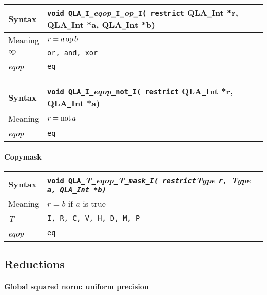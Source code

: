 \documentclass{article}
\newcommand{\op}{\mathop{\rm op}}
\renewcommand{\not}{\mathop{\rm not}}
\newcommand{\tInt}{QLA\ttdash Int }
\newcommand{\namespace}{QLA}
\newcommand{\allNumericTypes}{{\tt I, R, C, V, H, D, M, P}}
\newcommand{\ttdash}{{\tt \_}}
\newcommand{\itt}{\it T}
\newcommand{\extraarg}{}
\begin{document}
\begin{flushleft}
  \begin{tabular}{|l|l|}
  \hline
  Syntax      & {\tt void \namespace}\ttdash{\tt I}\ttdash{\it eqop}\ttdash{\tt I}\ttdash{\it op}\ttdash{\tt I( restrict}{ \tInt *r, \tInt *a, \tInt *b\extraarg)} \\
  \hline
  Meaning     & $r = a \op b$\\
  \hline
  $\op$       & {\tt or, and, xor} \\
  \hline
  {\it eqop}  & {\tt eq} \\
  \hline
  \end{tabular}
\end{flushleft}

\begin{flushleft}
  \begin{tabular}{|l|l|}
  \hline
  Syntax      & {\tt void \namespace}\ttdash{\tt I}\ttdash{\it eqop}\ttdash{\tt not}\ttdash{\tt I( restrict}{ \tInt *r, \tInt *a)} \\
  \hline
  Meaning     & $r = \not a$\\
  \hline
  {\it eqop}  & {\tt eq} \\
  \hline
  \end{tabular}
\end{flushleft}

\paragraph{Copymask}

\begin{flushleft}
  \begin{tabular}{|l|l|}
  \hline
  Syntax      & {\tt void \namespace}\ttdash\itt\ttdash{\it eqop}\ttdash\itt\ttdash{\tt mask}\ttdash{\tt I}{\tt ( restrict}{\it Type }{\tt *r, }{\it Type }{\tt *a, }{\tt \tInt *b\extraarg)} \\
  \hline
  Meaning     & $r = b$ if $a$ is true\\
  \hline
  \itt        & \allNumericTypes \\
  \hline
  {\it eqop}  & {\tt eq} \\
  \hline
  \end{tabular}
\end{flushleft}

\subsection{Reductions}

\paragraph{Global squared norm: uniform precision}
\end{document}
